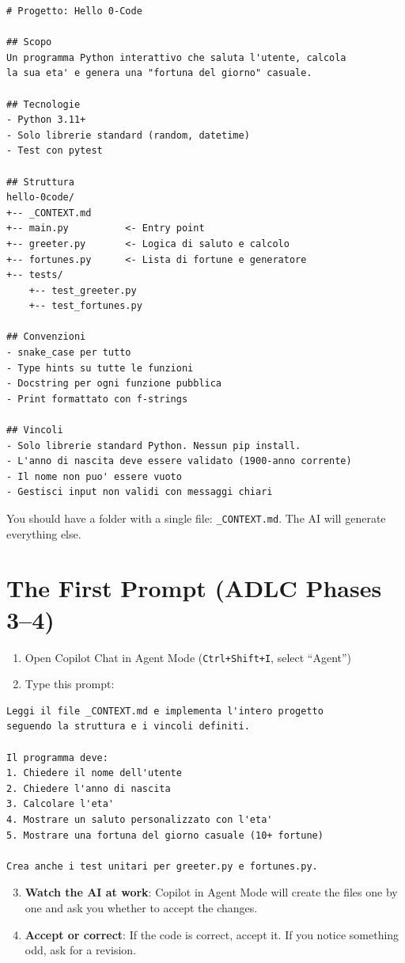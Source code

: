 \begin{lstlisting}[language={},title={\texttt{\_CONTEXT.md} for Hello 0-Code}]
# Progetto: Hello 0-Code

## Scopo
Un programma Python interattivo che saluta l'utente, calcola
la sua eta' e genera una "fortuna del giorno" casuale.

## Tecnologie
- Python 3.11+
- Solo librerie standard (random, datetime)
- Test con pytest

## Struttura
hello-0code/
+-- _CONTEXT.md
+-- main.py          <- Entry point
+-- greeter.py       <- Logica di saluto e calcolo
+-- fortunes.py      <- Lista di fortune e generatore
+-- tests/
    +-- test_greeter.py
    +-- test_fortunes.py

## Convenzioni
- snake_case per tutto
- Type hints su tutte le funzioni
- Docstring per ogni funzione pubblica
- Print formattato con f-strings

## Vincoli
- Solo librerie standard Python. Nessun pip install.
- L'anno di nascita deve essere validato (1900-anno corrente)
- Il nome non puo' essere vuoto
- Gestisci input non validi con messaggi chiari
\end{lstlisting}

\begin{checkpointbox}
You should have a folder with a single file: \texttt{\_CONTEXT.md}. The AI will generate everything else.
\end{checkpointbox}

\section{The First Prompt (ADLC Phases 3--4)}

\begin{praticabox}[title={Hands-on --- Generating the code}]
\begin{enumerate}
  \item Open Copilot Chat in Agent Mode (\texttt{Ctrl+Shift+I}, select ``Agent'')
  \item Type this prompt:
\end{enumerate}
\begin{lstlisting}[language={}]
Leggi il file _CONTEXT.md e implementa l'intero progetto
seguendo la struttura e i vincoli definiti.

Il programma deve:
1. Chiedere il nome dell'utente
2. Chiedere l'anno di nascita
3. Calcolare l'eta'
4. Mostrare un saluto personalizzato con l'eta'
5. Mostrare una fortuna del giorno casuale (10+ fortune)

Crea anche i test unitari per greeter.py e fortunes.py.
\end{lstlisting}
\begin{enumerate}
  \setcounter{enumi}{2}
  \item \textbf{Watch the AI at work}: Copilot in Agent Mode will create the files one by one and ask you whether to accept the changes.
  \item \textbf{Accept or correct}: If the code is correct, accept it. If you notice something odd, ask for a revision.
\end{enumerate}
\end{praticabox}

